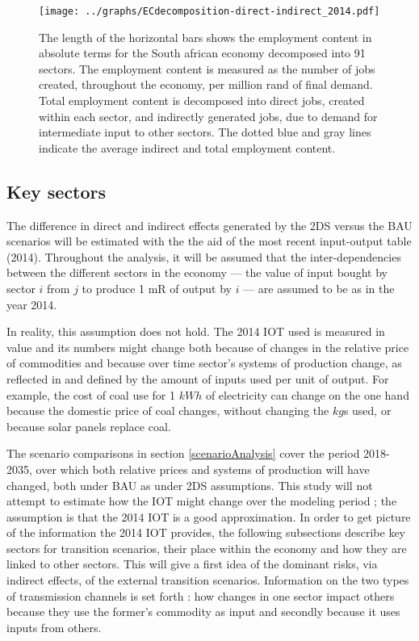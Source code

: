 \documentclass[12pt,english]{article}
\begin{document}
\begin{figure}[!ht]
	\centering
	\thispagestyle{empty}
		\texttt{[image: ../graphs/ECdecomposition-direct-indirect\_2014.pdf]}
	\caption{\label{Decomposition_direct_indirect_absolute} The length of the horizontal bars shows the employment content in absolute terms for the South african economy decomposed into 91 sectors. The employment content is measured as the number of jobs created, throughout the economy, per million rand of final demand. Total employment content is decomposed into direct jobs, created within each sector, and indirectly generated jobs, due to demand for intermediate input to other sectors. The dotted blue and gray lines indicate the average indirect and total employment content.}
\end{figure}	

\clearpage

\subsection{Key sectors}
The difference in direct and indirect effects generated by the 2DS versus the BAU scenarios will be estimated with the the aid of the most recent input-output table (2014). Throughout the analysis, it will be assumed that the inter-dependencies between the different sectors in the economy --- the value of input bought by sector $i$ from $j$ to produce 1 mR of output by $i$ --- are assumed to be as in the year 2014. %

In reality, this assumption does not hold. The 2014 IOT used is measured in value and its numbers might change both because of changes in the relative price of commodities and because over time sector's systems of production change, as reflected in and defined by the amount of inputs used per unit of output. For example, the cost of coal use for 1 $kWh$ of electricity can change on the one hand because the domestic price of coal changes, without changing the $kg$s used, or because solar panels replace coal.

The scenario comparisons in section \ref{scenarioAnalysis} cover the period 2018-2035, over which both relative prices and systems of production will have changed, both under BAU as under 2DS assumptions. This study will not attempt to estimate how the IOT might change over the modeling period ; the assumption is that the 2014 IOT is a good approximation. In order to get picture of the information the 2014 IOT provides, the following subsections describe key sectors for transition scenarios, their place within the economy and how they are linked to other sectors. This will give a first idea of the dominant risks, via indirect effects, of the external transition scenarios. Information on the two types of transmission channels is set forth : how changes in one sector impact others because they use the former's commodity as input and secondly because it uses inputs from others. 
\end{document}
